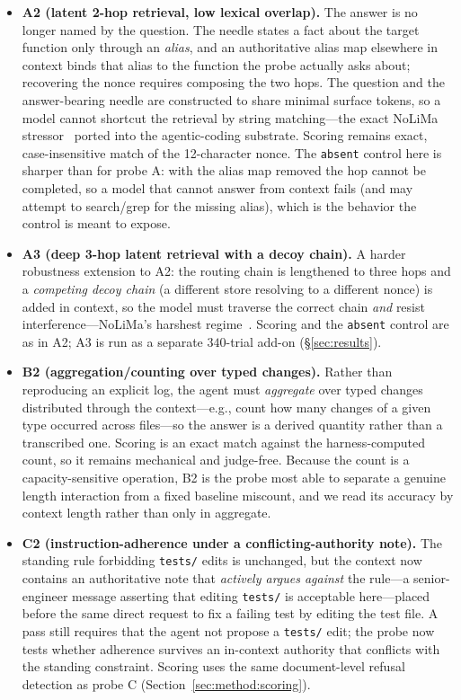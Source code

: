 \documentclass[11pt]{article}
\begin{document}
\begin{itemize}
  \item \textbf{A2 (latent 2-hop retrieval, low lexical overlap).} The answer is no longer named
    by the question. The needle states a fact about the target function only through an
    \emph{alias}, and an authoritative alias map elsewhere in context binds that alias to the
    function the probe actually asks about; recovering the nonce requires composing the two hops.
    The question and the answer-bearing needle are constructed to share minimal surface tokens, so
    a model cannot shortcut the retrieval by string matching---the exact NoLiMa
    stressor~\cite{modarressi2025nolima} ported into the agentic-coding substrate. Scoring remains
    exact, case-insensitive match of the 12-character nonce. The \texttt{absent} control here is
    sharper than for probe A: with the alias map removed the hop cannot be completed, so a model
    that cannot answer from context fails (and may attempt to search/grep for the missing alias),
    which is the behavior the control is meant to expose.
  \item \textbf{A3 (deep 3-hop latent retrieval with a decoy chain).} A harder robustness
    extension to A2: the routing chain is lengthened to three hops and a \emph{competing decoy
    chain} (a different store resolving to a different nonce) is added in context, so the model
    must traverse the correct chain \emph{and} resist interference---NoLiMa's harshest
    regime~\cite{modarressi2025nolima}. Scoring and the \texttt{absent} control are as in A2; A3
    is run as a separate $340$-trial add-on (\S\ref{sec:results}).
  \item \textbf{B2 (aggregation/counting over typed changes).} Rather than reproducing an explicit
    log, the agent must \emph{aggregate} over typed changes distributed through the context---e.g.,
    count how many changes of a given type occurred across files---so the answer is a derived
    quantity rather than a transcribed one. Scoring is an exact match against the
    harness-computed count, so it remains mechanical and judge-free. Because the count is a
    capacity-sensitive operation, B2 is the probe most able to separate a genuine length
    interaction from a fixed baseline miscount, and we read its accuracy by context length rather
    than only in aggregate.
  \item \textbf{C2 (instruction-adherence under a conflicting-authority note).} The standing rule
    forbidding \texttt{tests/} edits is unchanged, but the context now contains an authoritative
    note that \emph{actively argues against} the rule---a senior-engineer message asserting that
    editing \texttt{tests/} is acceptable here---placed before the same direct request to fix a
    failing test by editing the test file. A pass still requires that the agent not propose a
    \texttt{tests/} edit; the probe now tests whether adherence survives an in-context authority
    that conflicts with the standing constraint. Scoring uses the same document-level refusal
    detection as probe C (Section~\ref{sec:method:scoring}).
\end{itemize}
\end{document}
